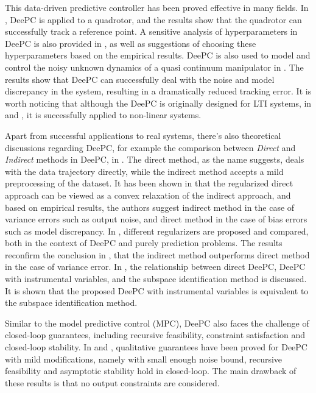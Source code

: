 This data-driven predictive controller has been proved effective in many fields.
In \cite{elokdaDataQuad2021}, DeePC is applied to a quadrotor, and the results show that the quadrotor can successfully track a reference point.
A sensitive analysis of hyperparameters in DeePC is also provided in \cite{elokdaDataQuad2021}, as well as suggestions of choosing these hyperparameters based on the empirical results.
DeePC is also used to model and control the noisy unknown dynamics of a quasi continuum manipulator in \cite{mullerDataDrivenQCR2022}.
The results show that DeePC can successfully deal with the noise and model discrepancy in the system, resulting in a dramatically reduced tracking error.
It is worth noticing that although the DeePC is originally designed for LTI systems, in \cite{elokdaDataQuad2021} and \cite{mullerDataDrivenQCR2022}, it is successfully applied to non-linear systems.

Apart from successful applications to real systems, there's also theoretical discussions regarding DeePC, for example the comparison between \emph{Direct} and \emph{Indirect} methods in DeePC, in \cite{dorflerBridgingDirectIndirect2023}.
The direct method, as the name suggests, deals with the data trajectory directly, while the indirect method accepts a mild preprocessing of the dataset.
It has been shown in \cite{dorflerBridgingDirectIndirect2023} that the regularized direct approach can be viewed as a convex relaxation of the indirect approach, and based on empirical results, the authors suggest indirect method in the case of variance errors such as output noise, and direct method in the case of bias errors such as model discrepancy.
In \cite{mattssonRegularizationDeePC}, different regularizers are proposed and compared, both in the context of DeePC and purely prediction problems.
The results reconfirm the conclusion in \cite{dorflerBridgingDirectIndirect2023}, that the indirect method outperforms direct method in the case of variance error.
In \cite{vanwingerdenInstrumentVar2022}, the relationship between direct DeePC, DeePC with instrumental variables, and the subspace identification method is discussed.
It is shown that the proposed DeePC with instrumental variables is equivalent to the subspace identification method.

Similar to the model predictive control (MPC), DeePC also faces the challenge of closed-loop guarantees, including recursive feasibility, constraint satisfaction and closed-loop stability.
In \cite{berberichDataDrivenRobust2021} and \cite{berberichStabilityInnerRobust2022IEEE}, qualitative guarantees have been proved for DeePC with mild modifications, namely with small enough noise bound, recursive feasibility and asymptotic stability hold in closed-loop.
The main drawback of these results is that no output constraints are considered.

